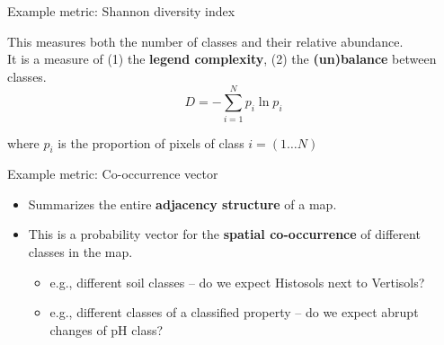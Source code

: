 \documentclass[aspectratio=169, 10pt]{beamer}
\begin{document}






\begin{frame}{Example metric: Shannon diversity index}
  \par
  This measures both the number of classes and their relative abundance.\\[2ex]
  It is a measure of (1) the \textbf{legend complexity}, (2) the \textbf{(un)balance} between classes.
    $$ D = - \sum_{i=1}^N p_i \ln p_i$$
  \par
    where $p_i$ is the proportion of pixels of class $i = (1 \ldots N)$
\end{frame}

\begin{frame}{Example metric: Co-occurrence vector}
  \begin{itemize}
  \item 
    Summarizes the entire \textbf{adjacency structure} of a map.%
  \item
    This is a probability vector for the \textbf{spatial co-occurrence} of  different   classes in the map.
    \begin{itemize}
    \item e.g., different soil classes -- do we expect Histosols next to Vertisols?
    \item e.g., different classes of a classified property -- do we expect abrupt changes of pH class?
    \end{itemize}
  \end{itemize}
\end{frame}
\end{document}
